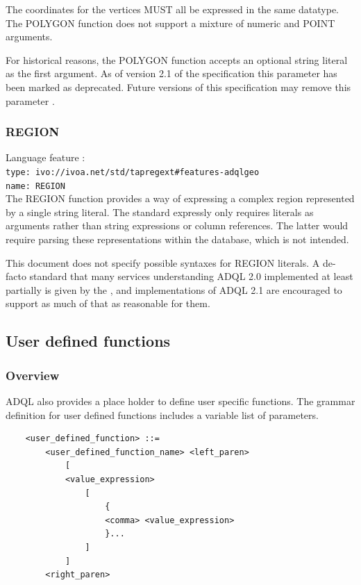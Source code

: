 \documentclass[11pt,a4paper]{ivoa}
\begin{document}
The coordinates for the vertices MUST all be expressed in the same datatype.
The POLYGON function does not support a mixture of numeric and POINT
arguments.

For historical reasons, the POLYGON function accepts an optional string literal
as the first argument.
As of version 2.1 of the specification this parameter has been
marked as deprecated.
Future versions of this specification may remove this parameter
.

\subsubsection{REGION}
\label{sec:functions.geom.region}

{\footnotesize Language feature :}\\
{\footnotesize \verb|type: ivo://ivoa.net/std/tapregext#features-adqlgeo|}\\
{\footnotesize \verb|name: REGION|}\\


The REGION function provides a way of expressing a complex region
represented by a single string literal. The standard expressly only
requires literals as arguments rather than string expressions or column
references. The latter would require parsing these representations
within the database, which is not intended.

This document does not specify possible syntaxes for REGION literals. A de-facto
standard that many services understanding ADQL 2.0 implemented at least
partially is given by the \STCSAppendix{}, and implementations of ADQL 2.1 are
encouraged to support as much of that as reasonable for them.

\subsection{User defined functions}
\label{sec:user.functions}
\subsubsection{Overview}

ADQL also provides a place holder to define user specific functions. The grammar
definition for user defined functions includes a variable list of parameters.

\begin{verbatim}
    <user_defined_function> ::=
        <user_defined_function_name> <left_paren>
            [
            <value_expression>
                [
                    {
                    <comma> <value_expression>
                    }...
                ]
            ]
        <right_paren>
\end{verbatim}
\end{document}
